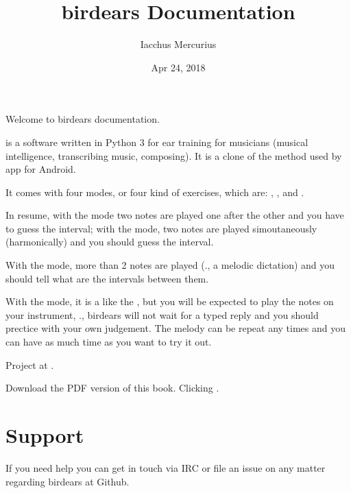 \documentclass[letterpaper,10pt,english]{sphinxmanual}
\title{birdears Documentation}
\date{Apr 24, 2018}
\author{Iacchus Mercurius}
\begin{document}
\maketitle
\sphinxtableofcontents
{}\label{\detokenize{index::doc}}


Welcome to birdears documentation.

 is a software written in Python 3 for ear training for
musicians (musical intelligence, transcribing music, composing). It is a
clone of the method used by 
app for Android.

It comes with four modes, or four kind of exercises, which are:
, ,  and .

In resume, with the  mode two notes are played one after the
other and you have to guess the interval; with the  mode,
two notes are played simoutaneously (harmonically) and you should guess
the interval.

With the  mode, more than 2 notes are played (., a
melodic dictation) and you should tell what are the intervals between
them.

With the  mode, it is a like the , but you will
be expected to play the notes on your instrument, ., birdears will
not wait for a typed reply and you should prectice with your own
judgement. The melody can be repeat any times and you can have as much
time as you want to try it out.

Project at .

Download the PDF version of this book. Clicking .




\chapter{Support}
\label{\detokenize{community:birdears-documentation}}\label{\detokenize{community::doc}}\label{\detokenize{community:support}}
If you need help you can get in touch via IRC or file an issue on any matter regarding birdears at Github.
\end{document}
